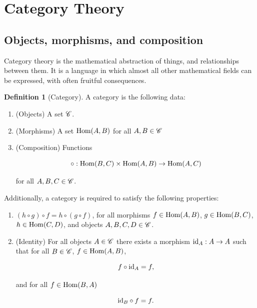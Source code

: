\documentclass{article}
\theoremstyle{definition}
\newtheorem*{definition}{Definition}
\numberwithin{figure}{section}
\begin{document}
\section{Category Theory}
\label{Categories}

\subsection{Objects, morphisms, and composition}
\label{Objects}

Category theory is the mathematical abstraction of things, and relationships between them. It is a language in which almost all other mathematical fields can be expressed, with often fruitful consequences.

\begin{definition}[Category] A category is the following data:

\begin{enumerate}
\item (Objects) A set $\mathscr{C}$.
\item (Morphisms) A set $\mathrm{Hom}(A,B)$ for all $A,B\in \mathscr{C}$
\item (Composition) Functions

$$\circ: \mathrm{Hom}(B,C)\times \mathrm{Hom}(A,B)\to \mathrm{Hom}(A,C)$$

for all $A,B,C\in \mathscr{C}$.
\end{enumerate}

Additionally, a category is required to satisfy the following properties:

\begin{enumerate}

\item $(h\circ g)\circ f = h\circ (g\circ f)$, for all morphisms $f\in \mathrm{Hom}(A,B)$, $g\in \mathrm{Hom}(B,C)$, $h\in\mathrm{Hom}(C,D)$,  and objects $A,B,C,D\in \mathscr{C}$.

\item (Identity) For all objects $A\in \mathscr{C}$ there exists a morphism $\mathrm{id}_{A}: A\to A$ such that for all $B\in \mathscr{C}$, $f\in \mathrm{Hom}(A,B)$,

$$f\circ \mathrm{id}_{A}=f,$$

and for all $f\in \mathrm{Hom}(B,A)$

$$\mathrm{id}_{B}\circ f = f.$$

\end{enumerate}

\raggedleft\qedsymbol{}
\end{definition}
\end{document}
